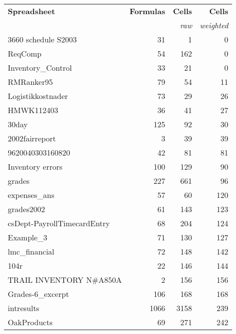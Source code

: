 \begin{table}[!t]
  \centering \begin{tabular}{l|rrr} \small{\bf{Spreadsheet}}
    & \small{\bf{Formulas}} & \small{\bf{Cells}} & \small{\bf{Cells}} \\ & &
    {\small{\it{raw}}} & {\small{\it{weighted}}} \\ \hline
\small{3660 schedule S2003} & \small{31} & \small{1} & \small{0} \\ 
\small{ReqComp} & \small{54} & \small{162} & \small{0} \\ 
\small{Inventory\_Control} & \small{33} & \small{21} & \small{0} \\ 
\small{RMRanker95} & \small{79} & \small{54} & \small{11} \\ 
\small{Logistikkostnader} & \small{73} & \small{29} & \small{26} \\ 
\small{HMWK112403} & \small{36} & \small{41} & \small{27} \\ 
\small{30day} & \small{125} & \small{92} & \small{30} \\ 
\small{2002fairreport} & \small{3} & \small{39} & \small{39} \\ 
\small{9620040303160820} & \small{42} & \small{81} & \small{81} \\ 
\small{Inventory errors} & \small{100} & \small{129} & \small{90} \\ 
\small{grades} & \small{227} & \small{661} & \small{96} \\ 
\small{expenses\_ans} & \small{57} & \small{60} & \small{120} \\ 
\small{grades2002} & \small{61} & \small{143} & \small{123} \\ 
\small{csDept-PayrollTimecardEntry} & \small{68} & \small{204} & \small{124} \\ 
\small{Example\_3} & \small{71} & \small{130} & \small{127} \\ 
\small{lmc\_financial} & \small{72} & \small{148} & \small{142} \\ 
\small{104r} & \small{22} & \small{146} & \small{144} \\ 
\small{TRAIL INVENTORY N\#A850A} & \small{2} & \small{156} & \small{156} \\ 
\small{Grades-6\_excerpt} & \small{106} & \small{168} & \small{168} \\ 
\small{intresults} & \small{1066} & \small{3158} & \small{239} \\ 
\small{OakProducts} & \small{69} & \small{271} & \small{242} \\ 

\end{tabular}
\end{table}
